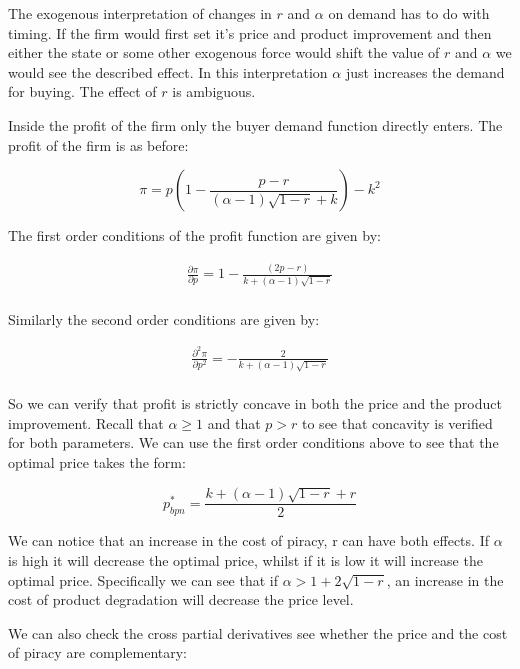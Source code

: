 \documentclass[11pt]{article}
\begin{document}
The exogenous interpretation of changes in $r$ and $\alpha$ on demand has to do with timing. If the firm would first set it's price and product improvement and then either the state or some other exogenous force would shift the value of $r$ and $\alpha$ we would see the described effect. In this interpretation $\alpha$ just increases the demand for buying. The effect of $r$ is ambiguous. 

Inside the profit of the firm only the buyer demand function directly enters. The profit of the firm is as before: 

\begin{equation*}
\pi = p\left( 
1 - \frac{p-r}{(\alpha - 1) \sqrt{1-r} +k}
\right)
-k^2
\end{equation*}

The first order conditions of the profit function are given by:

\begin{align*} \label{FOC}
\frac{\partial \pi }{\partial p} = 1-\frac{ (2p-r)}{
k+ (\alpha-1)\sqrt{ 1 -r }} \\
\end{align*}

Similarly the second order conditions are given by:

\begin{align*}
\frac{\partial^2 \pi }{\partial p^2}
= -\frac{ 2}{
k+ (\alpha-1)\sqrt{ 1 -r }} \\
\end{align*}

So we can verify that profit is strictly concave in both the price and the product improvement. Recall that $\alpha \geq 1$ and that $p>r$ to see that concavity is verified for both parameters. We can use the first order conditions above to see that the optimal price takes the form:

\begin{equation}\label{TNB}
p_{bpn}^* = \frac{k+ (\alpha-1)\sqrt{ 1 -r }+r}{2}
\end{equation}

We can notice that an increase in the cost of piracy, r can have both effects. If $\alpha$ is high it will decrease the optimal price, whilst if it is low it will increase the optimal price.  Specifically we can see that if $\alpha> 1+2 \sqrt{1-r}$, an increase in the cost of product degradation will decrease the price level. 

We can also check the cross partial derivatives see whether the price and the cost of piracy are complementary:
\end{document}
